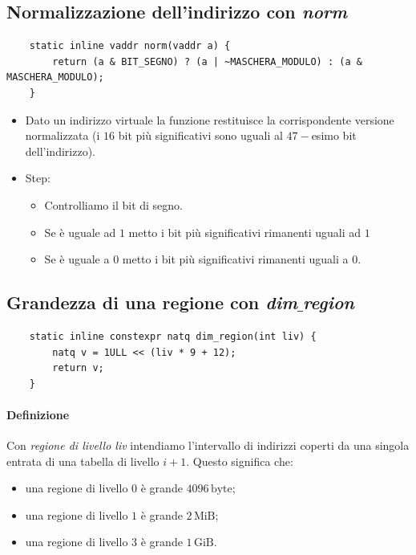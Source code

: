 \subsection{Normalizzazione dell'indirizzo con \emph{norm}}
\small 
\begin{verbatim}
	static inline vaddr norm(vaddr a) {
		return (a & BIT_SEGNO) ? (a | ~MASCHERA_MODULO) : (a & MASCHERA_MODULO);
	}
\end{verbatim}
\normalsize 
\begin{itemize}
	\item Dato un indirizzo virtuale la funzione restituisce la corrispondente versione normalizzata (i $16$ bit più significativi sono uguali al $47-$esimo bit dell'indirizzo).
	\item Step:
	\begin{itemize}
		\item Controlliamo il bit di segno.
		\item Se è uguale ad $1$ metto i bit più significativi rimanenti uguali ad $1$
		\item Se è uguale a 0 metto  i bit più significativi rimanenti uguali a $0$.
	\end{itemize}
\end{itemize}
\subsection{Grandezza di una regione con \emph{dim$\_$region}}
\small 
\begin{verbatim}
	static inline constexpr natq dim_region(int liv) {
		natq v = 1ULL << (liv * 9 + 12);
		return v;
	}
\end{verbatim}
\normalsize 
\paragraph{Definizione} Con \emph{regione di livello liv} intendiamo l'intervallo di indirizzi coperti da una singola entrata di una tabella di livello $i+1$. Questo significa che:
\begin{itemize}
	\item una regione di livello $0$ è grande $4096\,\text{byte}$;
	\item una regione di livello $1$ è grande $2\,\text{MiB}$;
	\item una regione di livello $3$ è grande $1\,\text{GiB}$.
\end{itemize}
